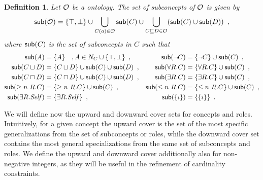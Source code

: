 \documentclass[
]{ceurart}
\newtheorem{definition}{Definition}
\begin{document}
\begin{definition}
  Let $\mathcal{O}$ be a \SROIQ ontology. The set of \emph{subconcepts} of $\mathcal{O}$ is given by 
  \begin{align*}
    \mathop{\mathsf{sub}}(\mathcal{O}) = \{\top, \bot\} \cup \bigcup_{C(a) \in \mathcal{O}} \mathop{\mathsf{sub}}(C) \cup \bigcup_{C \sqsubseteq D \in \mathcal{O}} ( \mathop{\mathsf{sub}}(C) \cup \mathop{\mathsf{sub}}(D) ) \enspace,
  \end{align*}
  where $\mathop{\mathsf{sub}}(C)$ is the set of \emph{subconcepts} in $C$ such that
  \begin{align*}
    \mathop{\mathsf{sub}}(A) &= \{ A \} \quad , A \in N_C \cup \{ \top, \bot \} \enspace, &
    \mathop{\mathsf{sub}}(\lnot C) &= \{ \lnot C \} \cup \mathop{\mathsf{sub}}(C) \enspace, \\
    \mathop{\mathsf{sub}}(C \sqcup D) &= \{ C \sqcup D \} \cup \mathop{\mathsf{sub}}(C) \cup \mathop{\mathsf{sub}}(D) \enspace, &
    \mathop{\mathsf{sub}}(\forall R.C) &= \{ \forall R.C \} \cup \mathop{\mathsf{sub}}(C) \enspace, \\
    \mathop{\mathsf{sub}}(C \sqcap D) &= \{ C \sqcap D \} \cup \mathop{\mathsf{sub}}(C) \cup \mathop{\mathsf{sub}}(D) \enspace, &
    \mathop{\mathsf{sub}}(\exists R.C) &= \{ \exists R.C \} \cup \mathop{\mathsf{sub}}(C) \enspace, \\
    \mathop{\mathsf{sub}}(\geq n~R.C) &= \{ \geq n~R.C \} \cup \mathop{\mathsf{sub}}(C) \enspace, &
    \mathop{\mathsf{sub}}(\leq n~R.C) &= \{ \leq n~R.C \} \cup \mathop{\mathsf{sub}}(C) \enspace, \\
    \mathop{\mathsf{sub}}(\exists R.\mathit{Self}) &= \{ \exists R.\mathit{Self} \} \enspace, &
    \mathop{\mathsf{sub}}(\{i\}) &= \{ \{i\} \} \enspace.
  \end{align*}
\end{definition}

We will define now the upward and downward cover sets for concepts and roles. Intuitively, for a given concept the upward cover is the set of the most specific generalizations from the set of subconcepts or roles, while the downward cover set contains the most general specializations from the same set of subconcepts and roles. We define the upward and downward cover additionally also for non-negative integers, as they will be useful in the refinement of cardinality constraints.
\end{document}
